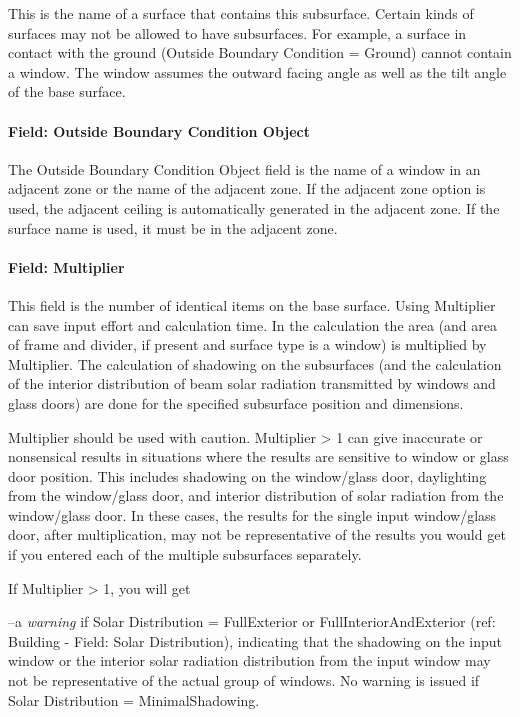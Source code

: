 This is the name of a surface that contains this subsurface. Certain kinds of surfaces may not be allowed to have subsurfaces. For example, a surface in contact with the ground (Outside Boundary Condition = Ground) cannot contain a window. The window assumes the outward facing angle as well as the tilt angle of the base surface.

\paragraph{Field: Outside Boundary Condition Object}\label{field-outside-boundary-condition-object-3}

The Outside Boundary Condition Object field is the name of a window in an adjacent zone or the name of the adjacent zone. If the adjacent zone option is used, the adjacent ceiling is automatically generated in the adjacent zone. If the surface name is used, it must be in the adjacent zone.

\paragraph{Field: Multiplier}\label{field-multiplier-4}

This field is the number of identical items on the base surface. Using Multiplier can save input effort and calculation time. In the calculation the area (and area of frame and divider, if present and surface type is a window) is multiplied by Multiplier. The calculation of shadowing on the subsurfaces (and the calculation of the interior distribution of beam solar radiation transmitted by windows and glass doors) are done for the specified subsurface position and dimensions.

Multiplier should be used with caution. Multiplier \textgreater{} 1 can give inaccurate or nonsensical results in situations where the results are sensitive to window or glass door position. This includes shadowing on the window/glass door, daylighting from the window/glass door, and interior distribution of solar radiation from the window/glass door. In these cases, the results for the single input window/glass door, after multiplication, may not be representative of the results you would get if you entered each of the multiple subsurfaces separately.

If Multiplier \textgreater{} 1, you will get

--a \emph{warning} if Solar Distribution = FullExterior or FullInteriorAndExterior (ref: Building - Field: Solar Distribution), indicating that the shadowing on the input window or the interior solar radiation distribution from the input window may not be representative of the actual group of windows. No warning is issued if Solar Distribution = MinimalShadowing.

